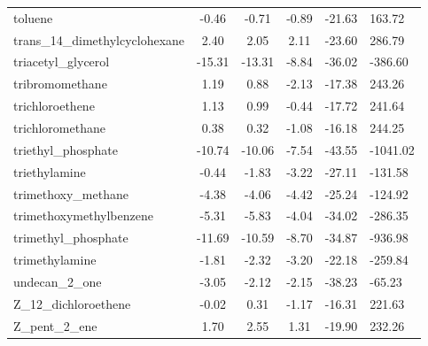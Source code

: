\documentclass{amsart}
\begin{document}
\begin{longtable}{L|C|C|C|X|X}
toluene & -0.46 & -0.71 & -0.89 & -21.63 & 163.72 \\ 
trans\_14\_dimethylcyclohexane & 2.40 & 2.05 & 2.11 & -23.60 & 286.79 \\ 
triacetyl\_glycerol & -15.31 & -13.31 & -8.84 & -36.02 & -386.60 \\ 
tribromomethane & 1.19 & 0.88 & -2.13 & -17.38 & 243.26 \\ 
trichloroethene & 1.13 & 0.99 & -0.44 & -17.72 & 241.64 \\ 
trichloromethane & 0.38 & 0.32 & -1.08 & -16.18 & 244.25 \\ 
triethyl\_phosphate & -10.74 & -10.06 & -7.54 & -43.55 & -1041.02 \\ 
triethylamine & -0.44 & -1.83 & -3.22 & -27.11 & -131.58 \\ 
trimethoxy\_methane & -4.38 & -4.06 & -4.42 & -25.24 & -124.92 \\ 
trimethoxymethylbenzene & -5.31 & -5.83 & -4.04 & -34.02 & -286.35 \\ 
trimethyl\_phosphate & -11.69 & -10.59 & -8.70 & -34.87 & -936.98 \\ 
trimethylamine & -1.81 & -2.32 & -3.20 & -22.18 & -259.84 \\ 
undecan\_2\_one & -3.05 & -2.12 & -2.15 & -38.23 & -65.23 \\ 
Z\_12\_dichloroethene & -0.02 & 0.31 & -1.17 & -16.31 & 221.63 \\ 
Z\_pent\_2\_ene & 1.70 & 2.55 & 1.31 & -19.90 & 232.26 \\ 
\end{longtable} 
\end{document}
